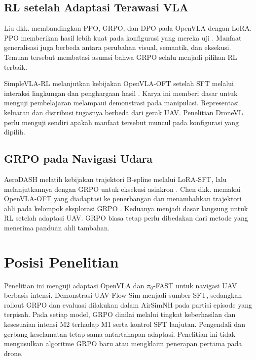 \subsection{RL setelah Adaptasi Terawasi VLA}
Liu dkk. membandingkan PPO, GRPO, dan DPO pada OpenVLA dengan LoRA. PPO memberikan hasil lebih kuat pada konfigurasi yang mereka uji \citep{liu2025rlvla}. Manfaat generalisasi juga berbeda antara perubahan visual, semantik, dan eksekusi. Temuan tersebut membatasi asumsi bahwa GRPO selalu menjadi pilihan RL terbaik.

SimpleVLA-RL melanjutkan kebijakan OpenVLA-OFT setelah SFT melalui interaksi lingkungan dan penghargaan hasil \citep{li2026simplevlarl}. Karya ini memberi dasar untuk menguji pembelajaran melampaui demonstrasi pada manipulasi. Representasi keluaran dan distribusi tugasnya berbeda dari gerak UAV. Penelitian DroneVL perlu menguji sendiri apakah manfaat tersebut muncul pada konfigurasi yang dipilih.

\subsection{GRPO pada Navigasi Udara}
AeroDASH melatih kebijakan trajektori B-spline melalui LoRA-SFT, lalu melanjutkannya dengan GRPO untuk eksekusi asinkron \citep{liu2026aerodash}. Chen dkk. memakai OpenVLA-OFT yang diadaptasi ke penerbangan dan menambahkan trajektori ahli pada kelompok eksplorasi GRPO \citep{chen2026eggrpo}. Keduanya menjadi dasar langsung untuk RL setelah adaptasi UAV. GRPO biasa tetap perlu dibedakan dari metode yang menerima panduan ahli tambahan.

\section{Posisi Penelitian}
\label{sec:posisi_penelitian}
Penelitian ini menguji adaptasi OpenVLA dan $\pi_0$-FAST untuk navigasi UAV berbasis intensi. Demonstrasi UAV-Flow-Sim menjadi sumber SFT, sedangkan rollout GRPO dan evaluasi dilakukan dalam AirSimNH pada partisi episode yang terpisah. Pada setiap model, GRPO dinilai melalui tingkat keberhasilan dan kesesuaian intensi M2 terhadap M1 serta kontrol SFT lanjutan. Pengendali dan gerbang keselamatan tetap sama antartahapan adaptasi. Penelitian ini tidak mengusulkan algoritme GRPO baru atau mengklaim penerapan pertama pada drone.

